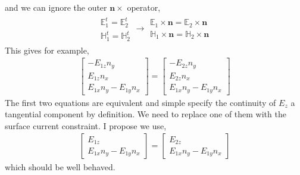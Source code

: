 \documentclass{article}
\newcommand{\n}{\mathbf{n}}
\newcommand{\0}{\varnothing}
\newcommand{\Ev}{\mathbb{E}}
\newcommand{\Hv}{\mathbb{H}}
\begin{document}
and we can ignore the outer $\n \times$ operator,
\begin{align*}
    \begin{array}{c}
    \Ev^t_{1} = \Ev^t_{2} \\
    \Hv^t_{1} = \Hv^t_{2} 
    \end{array}  \rightarrow
    \begin{array}{c}
    \Ev_1 \times \n = \Ev_2 \times \n\\ 
    \Hv_1 \times \n = \Hv_2 \times \n
    \end{array} 
\end{align*}
This gives for example,
\begin{align*}
    \left[
    \begin{array}{c}
        - E_{1z} n_y\\
        E_{1z} n_x \\
        E_{1x} n_y - E_{1y} n_x
    \end{array}
    \right] = 
       \left[
    \begin{array}{c}
        - E_{2z} n_y\\
        E_{2z} n_x \\
        E_{1x} n_y - E_{1y} n_x
    \end{array} 
    \right]
\end{align*}
The first two equations are equivalent and simple specify the continuity of $E_z$ a tangential component by definition. We need to replace one of them with the surface current constraint. I propose we use,
\begin{align*}
    \left[
    \begin{array}{c}
        E_{1z}\\
        E_{1x} n_y - E_{1y} n_x
    \end{array}
    \right] = 
       \left[
    \begin{array}{c}
        E_{2z} \\
        E_{1x} n_y - E_{1y} n_x
    \end{array} 
    \right]
\end{align*}
which should be well behaved.
\end{document}
